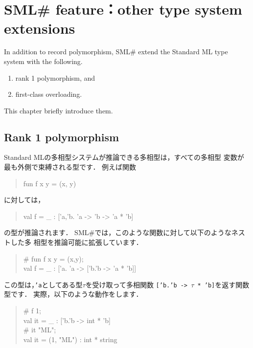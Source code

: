 \documentclass{jbook}
\newif\ifjp
\newcommand{\txt}[2]{#2}
\newcommand{\smlsharp}{SML\#}
\newenvironment{program}{\begin{quote}\begin{tt}}%
                        {\end{tt}\end{quote}}
\begin{document}
\chapter{
\txt{\smlsharp{}の拡張機能：その他の型の拡張}
    {\smlsharp{} feature：other type system extensions}}
\label{chap:tutorialOthertyping}

\ifjp%
	\smlsharp{}では，レコード多相性に加え，以下の２つの拡張をしてい
ます．
\begin{enumerate}
\item ランク１多相性
\item 第一級のオーバーローディング
\end{enumerate}
	本章では，これら機能を簡単に説明します．
\else%
	In addition to record polymorphism, \smlsharp{} extend the Standard
ML type system  with the following.
\begin{enumerate}
\item rank 1 polymorphism, and
\item first-class overloading.
\end{enumerate}
	This chapter briefly introduce them.
\fi%

\section{\txt{ランク１多相性}{Rank 1 polymorphism}}
\label{sec:extensionRank1}

\ifjp%
	Standard MLの多相型システムが推論できる多相型は，すべての多相型
変数が最も外側で束縛される型です．
	例えば関数
\begin{program}
fun f x y = (x, y)
\end{program}
に対しては，
\begin{program}
val f = \_ : ['a,'b. 'a -> 'b -> 'a * 'b]
\end{program}
の型が推論されます．
	\smlsharp{}では，このような関数に対して以下のようなネストした多
相型を推論可能に拡張しています．
\begin{program}
\# fun f x y = (x,y);\\
val f = \_ : ['a. 'a -> ['b.'b -> 'a * 'b]]
\end{program}
	この型は，{\tt 'a}としてある型$\tau$を受け取って多相関数
{\tt ['b.'b -> $\tau$ * 'b]}を返す関数型です．
	実際，以下のような動作をします．
\begin{program}
\# f 1;\\
val it = \_ : ['b.'b -> int * 'b]\\
\# it "ML";\\
val it = (1, "ML") : int * string
\end{program}
\end{document}
